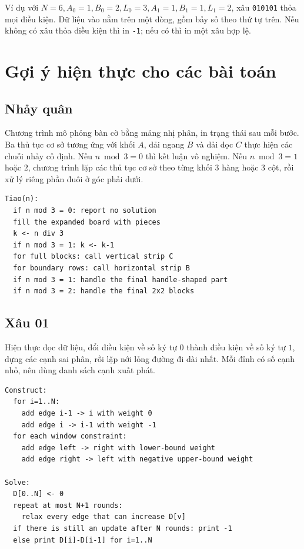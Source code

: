 \documentclass[11pt]{article}
\begin{document}
Ví dụ với $N=6,A_0=1,B_0=2,L_0=3,A_1=1,B_1=1,L_1=2$, xâu
\texttt{010101} thỏa mọi điều kiện. Dữ liệu vào nằm trên một dòng, gồm bảy
số theo thứ tự trên. Nếu không có xâu thỏa điều kiện thì in \texttt{-1}; nếu
có thì in một xâu hợp lệ.

\section{Gợi ý hiện thực cho các bài toán}

\subsection{Nhảy quân}

Chương trình mô phỏng bàn cờ bằng mảng nhị phân, in trạng thái sau mỗi bước.
Ba thủ tục cơ sở tương ứng với khối $A$, dải ngang $B$ và dải dọc $C$ thực
hiện các chuỗi nhảy cố định. Nếu $n\bmod 3=0$ thì kết luận vô nghiệm. Nếu
$n\bmod 3=1$ hoặc $2$, chương trình lặp các thủ tục cơ sở theo từng khối
$3$ hàng hoặc $3$ cột, rồi xử lý riêng phần đuôi ở góc phải dưới.

\begin{verbatim}
Tiao(n):
  if n mod 3 = 0: report no solution
  fill the expanded board with pieces
  k <- n div 3
  if n mod 3 = 1: k <- k-1
  for full blocks: call vertical strip C
  for boundary rows: call horizontal strip B
  if n mod 3 = 1: handle the final handle-shaped part
  if n mod 3 = 2: handle the final 2x2 blocks
\end{verbatim}

\subsection{Xâu 01}

Hiện thực đọc dữ liệu, đổi điều kiện về số ký tự $0$ thành điều kiện về số
ký tự $1$, dựng các cạnh sai phân, rồi lặp nới lỏng đường đi dài nhất. Mỗi
đỉnh có số cạnh nhỏ, nên dùng danh sách cạnh xuất phát.

\begin{verbatim}
Construct:
  for i=1..N:
    add edge i-1 -> i with weight 0
    add edge i -> i-1 with weight -1
  for each window constraint:
    add edge left -> right with lower-bound weight
    add edge right -> left with negative upper-bound weight

Solve:
  D[0..N] <- 0
  repeat at most N+1 rounds:
    relax every edge that can increase D[v]
  if there is still an update after N rounds: print -1
  else print D[i]-D[i-1] for i=1..N
\end{verbatim}
\end{document}
